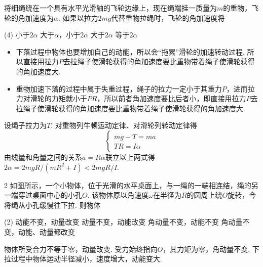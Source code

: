 \begin{problem}
    将细绳绕在一个具有水平光滑轴的飞轮边缘上，现在绳端挂一质量为$m$的重物，飞轮的角加速度为$\alpha$. 如果以拉力$2mg$代替重物拉绳时，飞轮的角加速度将
    \begin{tasks}(4)
        \task 小于$2\alpha$
        \task 大于$\alpha$，小于$2\alpha$
        \task[\true] 大于$2\alpha$
        \task 等于$2\alpha$
    \end{tasks}
\end{problem}
\begin{note}\leavevmode
\begin{itemize}
    \item 下落过程中物体也要增加自己的动能，所以会``拖累''滑轮的加速转动过程. 所以直接用拉力$P$去拉绳子使滑轮获得的角加速度要比重物带着绳子使滑轮获得的角加速度大.
    \item 重物加速下落的过程中属于失重过程，绳子的拉力一定小于其重力$P$，进而拉力对滑轮的力矩就小于$PR$，所以前者角加速度要比后者小，即直接用拉力$P$去拉绳子使滑轮获得的角加速度要比重物带着绳子使滑轮获得的角加速度大.
\end{itemize}
\end{note}
\begin{solution}
设绳子拉力为$T$. 对重物列牛顿运动定律、对滑轮列转动定律得
\[\begin{cases}
    mg-T=ma\\
    TR=I\alpha
\end{cases}\]
由线量和角量之间的关系$a=R\alpha$联立以上两式得$2\alpha=2mgR/(mR^2+I)<2mgR/I$.
\end{solution}

\begin{problem}
\begin{paracol}{2}
    如图所示，一个小物体，位于光滑的水平桌面上，与一绳的一端相连结，绳的另一端穿过桌面中心的小孔$O$. 该物体原以角速度$\omega$在半径为$R$的圆周上绕$O$旋转，今将绳从小孔缓慢往下拉. 则物体
    \switchcolumn\vspace*{\fill}\centering
    \vspace*{\fill}
\end{paracol}
\begin{tasks}(2)
    \task 动能不变，动量改变
    \task 动量不变，动能改变
    \task 角动量不变，动能不变
    \task[\true] 角动量不变，动能、动量都改变
\end{tasks}
\end{problem}
\begin{solution}
    物体所受合力不等于零，动量改变. 受力始终指向$O$，其力矩为零，角动量不变. 下拉过程中物体运动半径减小，速度增大，动能变大.
\end{solution}

